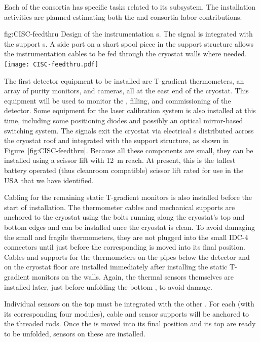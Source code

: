 Each of the   consortia has specific tasks related to its subsystem. 
The installation activities are planned estimating both the  and consortia labor contributions.

\begin{dunefigure}{fig:CISC-feedthru}
{Design of the instrumentation \fdth{}s. The signal \fdth is integrated with the  support \fdth{}s. A side port on a short spool piece in the  support structure allows the instrumentation cables to be fed through the cryostat walls where needed.}
\texttt{[image: CISC-feedthru.pdf]}
\end{dunefigure}

The first detector equipment to be installed are  T-gradient thermometers, an array of purity monitors, and cameras, all at the east end of the cryostat. This equipment will be used to monitor the \cooldown{}, filling, and commissioning of the detector. Some equipment for the laser calibration system is also installed at this time, including some positioning diodes and possibly an optical mirror-based switching system.  The signals exit the cryostat via electrical \fdth{}s distributed across the cryostat roof and integrated with the  support structure, as shown in Figure~\ref{fig:CISC-feedthru}. Because all these components are small, they can be installed using a scissor lift with \SI{12}{m} reach. At present, this is the tallest battery operated (thus cleanroom compatible) scissor lift rated for use in the USA that we have identified.



Cabling for the remaining static T-gradient monitors is also installed before the start of  installation.  The thermometer cables and mechanical supports are anchored to the cryostat using the bolts running along the cryostat's top and bottom edges and can be installed once the cryostat is clean. 
To avoid  damaging the small and fragile thermometers, they are not plugged into the small IDC-4 connectors until just before the corresponding  is moved into its final position. 
Cables and supports for the thermometers on the pipes below the detector and on the cryostat floor are installed immediately after installing the static T-gradient monitors on the walls.  
Again, the thermal sensors themselves are installed later, just before unfolding the bottom , to avoid damage.

Individual sensors on the top  must be integrated with the other . For each  (with its corresponding four  modules), cable and sensor supports will be anchored to the  threaded rods. Once the  is moved into its final position and its top  are ready to be unfolded, sensors on these  are installed.

